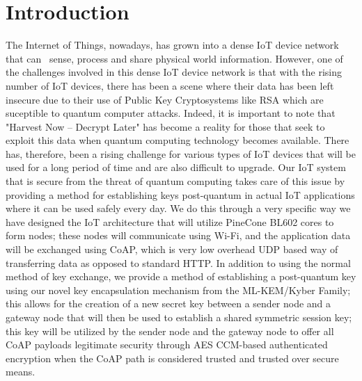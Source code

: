 \documentclass[a4paper]{scrartcl}
\begin{document}
	\section{Introduction}
    The Internet of Things, nowadays, has grown into a dense IoT device network that can  sense, process and share physical world information. However, one of the challenges involved in this dense IoT device network is that with the rising number of IoT devices, there has been a scene where their data has been left insecure due to their use of Public Key Cryptosystems like RSA which are suceptible to quantum computer attacks. Indeed, it is important to note that "Harvest Now – Decrypt Later" has become a reality for those that seek to exploit this data when quantum computing technology becomes available. There has, therefore, been a rising challenge for various types of IoT devices that will be used for a long period of time and are also difficult to upgrade.
    Our IoT system that is secure from the threat of quantum computing takes care of this issue by providing a method for establishing keys post-quantum in actual IoT applications where it can be used safely every day. We do this through a very specific way we have designed the IoT architecture that will utilize PineCone BL602 cores to form nodes; these nodes will communicate using Wi-Fi, and the application data will be exchanged using CoAP, which is very low overhead UDP based way of transferring data as opposed to standard HTTP. In addition to using the normal method of key exchange, we provide a method of establishing a post-quantum key using our novel key encapsulation mechanism from the ML-KEM/Kyber Family; this allows for the creation of a new secret key between a sender node and a gateway node that will then be used to establish a shared symmetric session key; this key will be utilized by the sender node and the gateway node to offer all CoAP payloads legitimate security through AES CCM-based authenticated encryption when the CoAP path is considered trusted and trusted over secure means.
\end{document}
